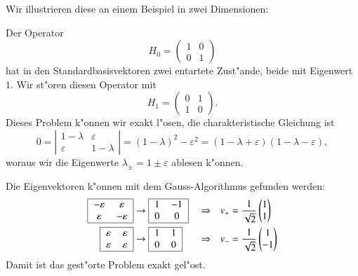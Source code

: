 Wir illustrieren diese an einem Beispiel in zwei Dimensionen:
\begin{beispiel}
Der Operator
\[
H_0=\begin{pmatrix}1&0\\0&1\end{pmatrix}
\]
hat in den Standardbasisvektoren zwei entartete Zust"ande, beide mit
Eigenwert $1$.
Wir st"oren diesen Operator mit 
\[
H_1=\begin{pmatrix} 0&1\\ 1&0 \end{pmatrix}.
\]
Dieses Problem k"onnen wir exakt l"osen, die charakteristische Gleichung
ist
\[
0=
\left|\begin{matrix}
1-\lambda&\varepsilon\\
\varepsilon&1-\lambda
\end{matrix}\right|
=(1-\lambda)^2-\varepsilon^2=(1-\lambda+\varepsilon)(1-\lambda-\varepsilon),
\]
woraus wir die Eigenwerte $\lambda_\pm = 1\pm\varepsilon$ ablesen k"onnen.

Die Eigenvektoren k"onnen mit dem Gauss-Algorithmus gefunden werden:
\[
\begin{aligned}
\begin{tabular}{|>{$}c<{$}>{$}c<{$}|}
\hline
-\varepsilon& \varepsilon\\
 \varepsilon&-\varepsilon\\
\hline
\end{tabular}
&\rightarrow
\begin{tabular}{|>{$}c<{$}>{$}c<{$}|}
\hline
1&-1\\0&0\\
\hline
\end{tabular}
&&\Rightarrow&
v_+&=\frac1{\sqrt{2}}\begin{pmatrix}1\\1\end{pmatrix}
\\
\begin{tabular}{|>{$}c<{$}>{$}c<{$}|}
\hline
 \varepsilon& \varepsilon\\
 \varepsilon& \varepsilon\\
\hline
\end{tabular}
&\rightarrow
\begin{tabular}{|>{$}c<{$}>{$}c<{$}|}
\hline
1& 1\\0&0\\
\hline
\end{tabular}
&&\Rightarrow&
v_-&=\frac1{\sqrt{2}}\begin{pmatrix}1\\-1\end{pmatrix}
\end{aligned}
\]
Damit ist das gest"orte Problem exakt gel"ost.


\end{beispiel}
